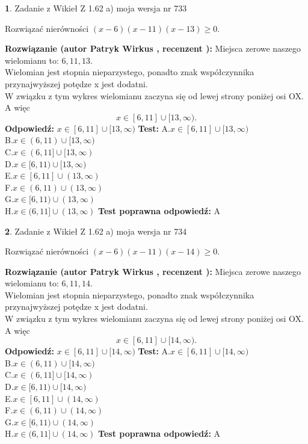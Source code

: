 \documentclass[12pt, a4paper]{article}
\theoremstyle{definition} %
\newtheorem{zad}{}
\newcommand{\zadStart}[1]{\begin{zad}#1\newline}
\newcommand{\zadStop}{\end{zad}}
\newcommand{\rozwStart}[2]{\noindent \textbf{Rozwiązanie (autor #1 , recenzent #2): }\newline}
\newcommand{\rozwStop}{\newline}
\newcommand{\odpStart}{\noindent \textbf{Odpowiedź:}\newline}
\newcommand{\odpStop}{\newline}
\newcommand{\testStart}{\noindent \textbf{Test:}\newline}
\newcommand{\testStop}{\newline}
\newcommand{\kluczStart}{\noindent \textbf{Test poprawna odpowiedź:}\newline}
\newcommand{\kluczStop}{\newline}
\begin{document}
\zadStart{Zadanie z Wikieł Z 1.62 a) moja wersja nr 733}

Rozwiązać nierówności $(x-6)(x-11)(x-13)\ge0$.
\zadStop
\rozwStart{Patryk Wirkus}{}
Miejsca zerowe naszego wielomianu to: $6, 11, 13$.\\
Wielomian jest stopnia nieparzystego, ponadto znak współczynnika przy\linebreak najwyższej potędze x jest dodatni.\\ W związku z tym wykres wielomianu zaczyna się od lewej strony poniżej osi OX. A więc $$x \in [6,11] \cup [13,\infty).$$
\rozwStop
\odpStart
$x \in [6,11] \cup [13,\infty)$
\odpStop
\testStart
A.$x \in [6,11] \cup [13,\infty)$\\
B.$x \in (6,11) \cup [13,\infty)$\\
C.$x \in (6,11] \cup [13,\infty)$\\
D.$x \in [6,11) \cup [13,\infty)$\\
E.$x \in [6,11] \cup (13,\infty)$\\
F.$x \in (6,11) \cup (13,\infty)$\\
G.$x \in [6,11) \cup (13,\infty)$\\
H.$x \in (6,11] \cup (13,\infty)$
\testStop
\kluczStart
A
\kluczStop



\zadStart{Zadanie z Wikieł Z 1.62 a) moja wersja nr 734}

Rozwiązać nierówności $(x-6)(x-11)(x-14)\ge0$.
\zadStop
\rozwStart{Patryk Wirkus}{}
Miejsca zerowe naszego wielomianu to: $6, 11, 14$.\\
Wielomian jest stopnia nieparzystego, ponadto znak współczynnika przy\linebreak najwyższej potędze x jest dodatni.\\ W związku z tym wykres wielomianu zaczyna się od lewej strony poniżej osi OX. A więc $$x \in [6,11] \cup [14,\infty).$$
\rozwStop
\odpStart
$x \in [6,11] \cup [14,\infty)$
\odpStop
\testStart
A.$x \in [6,11] \cup [14,\infty)$\\
B.$x \in (6,11) \cup [14,\infty)$\\
C.$x \in (6,11] \cup [14,\infty)$\\
D.$x \in [6,11) \cup [14,\infty)$\\
E.$x \in [6,11] \cup (14,\infty)$\\
F.$x \in (6,11) \cup (14,\infty)$\\
G.$x \in [6,11) \cup (14,\infty)$\\
H.$x \in (6,11] \cup (14,\infty)$
\testStop
\kluczStart
A
\kluczStop
\end{document}
